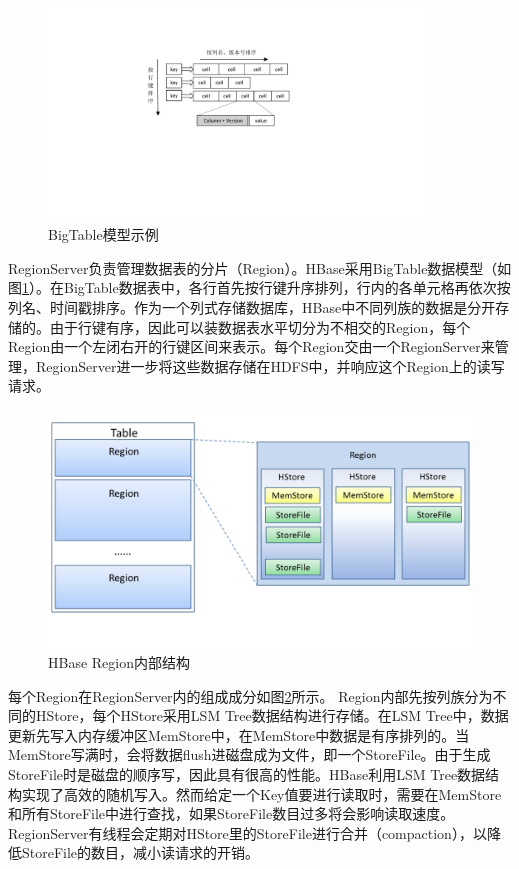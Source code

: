 \begin{figure}[htbp]
\centering
\includegraphics[width=100mm]{fig/big_table.pdf}
\caption{BigTable模型示例}
\label{fig:big_table}
\end{figure}

RegionServer负责管理数据表的分片（Region）。HBase采用BigTable数据模型（如图\ref{fig:big_table}）。在BigTable数据表中，各行首先按行键升序排列，行内的各单元格再依次按列名、时间戳排序。作为一个列式存储数据库，HBase中不同列族的数据是分开存储的。由于行键有序，因此可以装数据表水平切分为不相交的Region，每个Region由一个左闭右开的行键区间来表示。每个Region交由一个RegionServer来管理，RegionServer进一步将这些数据存储在HDFS中，并响应这个Region上的读写请求。

\begin{figure}[htbp]
\centering
\includegraphics[width=120mm]{fig/HBase_region.pdf}
\caption{HBase Region内部结构}
\label{fig:hbase_region}
\end{figure}

每个Region在RegionServer内的组成成分如图\ref{fig:hbase_region}所示。
Region内部先按列族分为不同的HStore，每个HStore采用LSM Tree\supercite{LSM_tree}数据结构进行存储。在LSM Tree中，数据更新先写入内存缓冲区MemStore中，在MemStore中数据是有序排列的。当MemStore写满时，会将数据flush进磁盘成为文件，即一个StoreFile。由于生成StoreFile时是磁盘的顺序写，因此具有很高的性能。HBase利用LSM Tree数据结构实现了高效的随机写入。然而给定一个Key值要进行读取时，需要在MemStore和所有StoreFile中进行查找，如果StoreFile数目过多将会影响读取速度。RegionServer有线程会定期对HStore里的StoreFile进行合并（compaction），以降低StoreFile的数目，减小读请求的开销。

